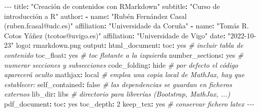 \documentclass[
]{book}
\newenvironment{Shaded}{\begin{snugshade}}{\end{snugshade}}
\newcommand{\AttributeTok}[1]{\textcolor[rgb]{0.77,0.63,0.00}{#1}}
\newcommand{\CharTok}[1]{\textcolor[rgb]{0.31,0.60,0.02}{#1}}
\newcommand{\CommentTok}[1]{\textcolor[rgb]{0.56,0.35,0.01}{\textit{#1}}}
\newcommand{\DecValTok}[1]{\textcolor[rgb]{0.00,0.00,0.81}{#1}}
\newcommand{\FunctionTok}[1]{\textcolor[rgb]{0.00,0.00,0.00}{#1}}
\newcommand{\KeywordTok}[1]{\textcolor[rgb]{0.13,0.29,0.53}{\textbf{#1}}}
\newcommand{\PreprocessorTok}[1]{\textcolor[rgb]{0.56,0.35,0.01}{\textit{#1}}}
\newcommand{\StringTok}[1]{\textcolor[rgb]{0.31,0.60,0.02}{#1}}
\theoremstyle{definition}
\theoremstyle{definition}
\theoremstyle{definition}
\theoremstyle{definition}
\theoremstyle{remark}
\begin{document}
\begin{Shaded}
\begin{Highlighting}[]
\PreprocessorTok{{-}{-}{-}}
\FunctionTok{title}\KeywordTok{:}\AttributeTok{ }\StringTok{"Creación de contenidos con RMarkdown"}
\FunctionTok{subtitle}\KeywordTok{:}\AttributeTok{ }\StringTok{"Curso de introducción a R"}
\FunctionTok{author}\KeywordTok{:}
\KeywordTok{{-}}\AttributeTok{ }\FunctionTok{name}\KeywordTok{:}\AttributeTok{ }\StringTok{"Rubén Fernández Casal (ruben.fcasal@udc.es)"}
\AttributeTok{  }\FunctionTok{affiliation}\KeywordTok{:}\AttributeTok{ }\StringTok{"Universidade da Coruña"}
\KeywordTok{{-}}\AttributeTok{ }\FunctionTok{name}\KeywordTok{:}\AttributeTok{ }\StringTok{"Tomás R. Cotos Yáñez (tcotos@uvigo.es)"}
\AttributeTok{  }\FunctionTok{affiliation}\KeywordTok{:}\AttributeTok{ }\StringTok{"Universidade de Vigo"}
\FunctionTok{date}\KeywordTok{:}\AttributeTok{ }\StringTok{"2022{-}10{-}23"}
\FunctionTok{logo}\KeywordTok{:}\AttributeTok{ rmarkdown.png}
\FunctionTok{output}\KeywordTok{:}
\AttributeTok{  }\FunctionTok{html\_document}\KeywordTok{:}
\AttributeTok{    }\FunctionTok{toc}\KeywordTok{:}\AttributeTok{ }\CharTok{yes}\CommentTok{                  \# incluir tabla de contenido}
\AttributeTok{    }\FunctionTok{toc\_float}\KeywordTok{:}\AttributeTok{ }\CharTok{yes}\CommentTok{            \# toc flotante a la izquierda}
\AttributeTok{    }\FunctionTok{number\_sections}\KeywordTok{:}\AttributeTok{ }\CharTok{yes}\CommentTok{      \# numerar secciones y subsecciones}
\AttributeTok{    }\FunctionTok{code\_folding}\KeywordTok{:}\AttributeTok{ hide}\CommentTok{        \# por defecto el código aparecerá oculto}
\AttributeTok{    }\FunctionTok{mathjax}\KeywordTok{:}\AttributeTok{ local}\CommentTok{            \# emplea una copia local de MathJax, hay que establecer:}
\AttributeTok{    }\FunctionTok{self\_contained}\KeywordTok{:}\AttributeTok{ }\CharTok{false}\CommentTok{     \# las dependencias se guardan en ficheros externos}
\AttributeTok{    }\FunctionTok{lib\_dir}\KeywordTok{:}\AttributeTok{ libs}\CommentTok{             \# directorio para librerías (Bootstrap, MathJax, ...)}
\AttributeTok{  }\FunctionTok{pdf\_document}\KeywordTok{:}
\AttributeTok{    }\FunctionTok{toc}\KeywordTok{:}\AttributeTok{ }\CharTok{yes}
\AttributeTok{    }\FunctionTok{toc\_depth}\KeywordTok{:}\AttributeTok{ }\DecValTok{2}
\AttributeTok{    }\FunctionTok{keep\_tex}\KeywordTok{:}\AttributeTok{ }\CharTok{yes}\CommentTok{             \# conservar fichero latex}
\AttributeTok{    }
\PreprocessorTok{{-}{-}{-}}
\end{Highlighting}
\end{Shaded}
\end{document}
